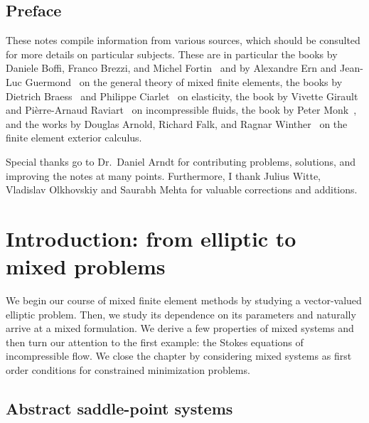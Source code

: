 
\maketitle

\section*{Preface}
%

These notes compile information from various sources, which should be
consulted for more details on particular subjects. These are in
particular the books by Daniele Boffi, Franco Brezzi, and Michel
Fortin~\cite{BoffiBrezziFortin13} and by Alexandre Ern and Jean-Luc
Guermond~\cite{ErnGuermond04} on the general theory of mixed finite
elements, the books by Dietrich Braess~\cite{Braess97,Braess13} and
Philippe Ciarlet~\cite{Ciarlet88} on elasticity, the book by Vivette
Girault and Pièrre-Arnaud Raviart~\cite{GiraultRaviart86} on
incompressible fluids, the book by Peter Monk~\cite{Monk03}, and the
works by Douglas Arnold, Richard Falk, and Ragnar
Winther~\cite{ArnoldFalkWinther06acta,ArnoldFalkWinther10} on the
finite element exterior calculus.

Special thanks go to Dr.~Daniel Arndt for contributing problems,
solutions, and improving the notes at many points. Furthermore, I
thank Julius Witte, Vladislav Olkhovskiy and Saurabh Mehta for
valuable corrections and additions.

\thispagestyle{empty}
\setcounter{page}{0}

\tableofcontents

\chapter{Introduction: from elliptic to mixed problems}
We begin our course of mixed finite element methods by studying a
vector-valued elliptic problem. Then, we study its dependence on its
parameters and naturally arrive at a mixed formulation. We derive a
few properties of mixed systems and then turn our attention to the
first example: the Stokes equations of incompressible flow. We close
the chapter by considering mixed systems as first order conditions
for constrained minimization problems.



\section{Abstract saddle-point systems}


